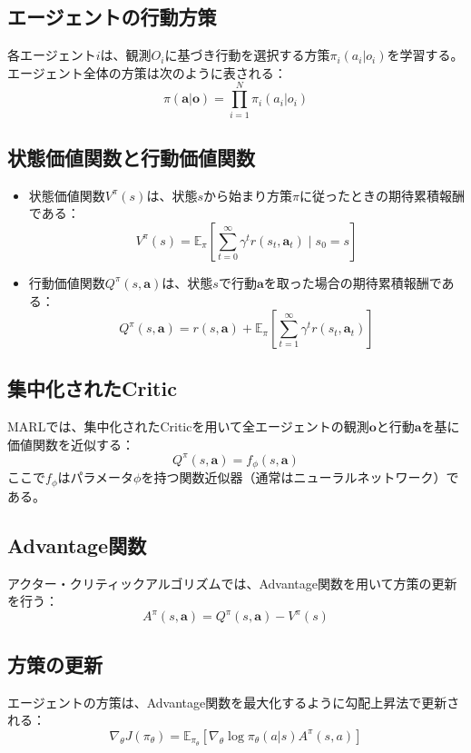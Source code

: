 \subsection*{エージェントの行動方策}
各エージェント$i$は、観測$O_i$に基づき行動を選択する方策$\pi_i(a_i | o_i)$を学習する。エージェント全体の方策は次のように表される：
\[
\pi(\boldsymbol{a} | \boldsymbol{o}) = \prod_{i=1}^N \pi_i(a_i | o_i)
\]

\subsection*{状態価値関数と行動価値関数}
\begin{itemize}
    \item 状態価値関数$V^\pi(s)$は、状態$s$から始まり方策$\pi$に従ったときの期待累積報酬である：
    \[
    V^\pi(s) = \mathbb{E}_\pi \left[ \sum_{t=0}^\infty \gamma^t r(s_t, \boldsymbol{a}_t) \mid s_0 = s \right]
    \]
    \item 行動価値関数$Q^\pi(s, \boldsymbol{a})$は、状態$s$で行動$\boldsymbol{a}$を取った場合の期待累積報酬である：
    \[
    Q^\pi(s, \boldsymbol{a}) = r(s, \boldsymbol{a}) + \mathbb{E}_\pi \left[ \sum_{t=1}^\infty \gamma^t r(s_t, \boldsymbol{a}_t) \right]
    \]
\end{itemize}

\subsection*{集中化されたCritic}
MARLでは、集中化されたCriticを用いて全エージェントの観測$\boldsymbol{o}$と行動$\boldsymbol{a}$を基に価値関数を近似する：
\[
Q^\pi(s, \boldsymbol{a}) = f_\phi(s, \boldsymbol{a})
\]
ここで$f_\phi$はパラメータ$\phi$を持つ関数近似器（通常はニューラルネットワーク）である。

\subsection*{Advantage関数}
アクター・クリティックアルゴリズムでは、Advantage関数を用いて方策の更新を行う：
\[
A^\pi(s, \boldsymbol{a}) = Q^\pi(s, \boldsymbol{a}) - V^\pi(s)
\]

\subsection*{方策の更新}
エージェントの方策は、Advantage関数を最大化するように勾配上昇法で更新される：
\[
\nabla_\theta J(\pi_\theta) = \mathbb{E}_{\pi_\theta} \left[ \nabla_\theta \log \pi_\theta(a | s) A^\pi(s, a) \right]
\]

